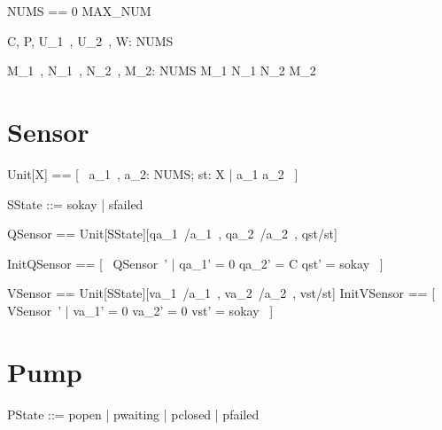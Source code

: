 \documentclass{report} %
\begin{document}
\begin{zed}
  NUMS == 0 \upto MAX\_NUM
\end{zed}

\begin{axdef}
  C, P, U\_1~, U\_2~, W: NUMS
\end{axdef}

\begin{axdef}
  M\_1~, N\_1~, N\_2~, M\_2: NUMS
\where %
  M\_1 \leq N\_1 \leq N\_2 \leq M\_2
\end{axdef}

\section{Sensor}

\begin{zed}
  Unit[X] == [~ a\_1~, a\_2: NUMS; st: X | a\_1 \leq a\_2 ~]
\end{zed}

\begin{zed}
  SState ::= sokay | sfailed
\end{zed}

\begin{zed}
  QSensor == Unit[SState][qa\_1~/a\_1~, qa\_2~/a\_2~, qst/st]
\end{zed}

\begin{zed}
  InitQSensor == [~ QSensor~' | qa\_1' = 0 \land qa\_2' = C \land qst' = sokay ~]
\end{zed}

\begin{zed}
  VSensor == Unit[SState][va\_1~/a\_1~, va\_2~/a\_2~, vst/st]
  \also %
  InitVSensor == [~ VSensor~' | va\_1' = 0 \land va\_2' = 0 \land vst' = sokay ~]
\end{zed}

\section{Pump}
\begin{zed}
  PState ::= popen | pwaiting | pclosed | pfailed
\end{zed}
\end{document}
